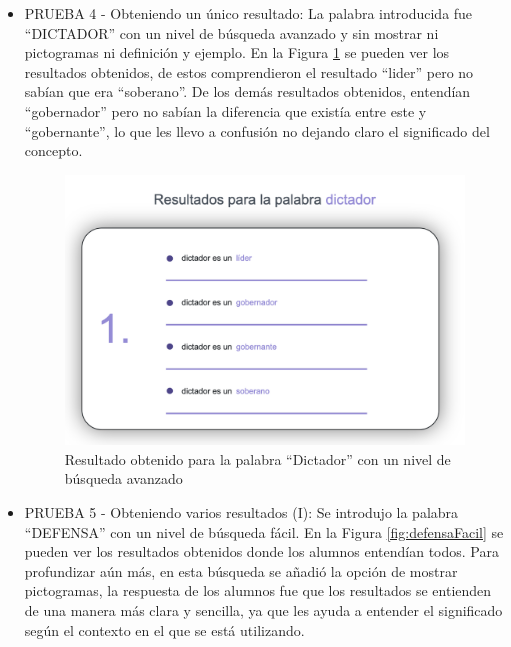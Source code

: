 \begin{itemize}
	\item PRUEBA 4 - Obteniendo un único resultado: La palabra introducida fue ``DICTADOR'' con un nivel de búsqueda avanzado y sin mostrar ni pictogramas ni definición y ejemplo. En la Figura \ref{fig:dictadorAvanzado} se pueden ver los resultados obtenidos, de estos comprendieron el resultado ``lider'' pero no sabían que era ``soberano''. De los demás resultados obtenidos, entendían ``gobernador'' pero no sabían la diferencia que existía entre este y ``gobernante'', lo que les llevo a confusión no dejando claro el significado del concepto.
	
		\begin{figure}[!h]
			\includegraphics[width=.7\textwidth]{Imagenes/Bitmap/Capitulo4/EvaluacionFinal/4dictadoravanzado.png}
			\centering
			\caption{Resultado obtenido para la palabra ``Dictador'' con un nivel de búsqueda avanzado}
			\label{fig:dictadorAvanzado}
		\end{figure}
	
	\item PRUEBA 5 - Obteniendo varios resultados (I):  Se introdujo la palabra ``DEFENSA'' con un nivel de búsqueda fácil. En la Figura \ref{fig:defensaFacil} se pueden ver los resultados obtenidos donde los alumnos entendían todos. Para profundizar aún más, en esta búsqueda se añadió la opción de mostrar pictogramas, la respuesta de los alumnos fue que los resultados se entienden de una manera más clara y sencilla, ya que les ayuda a entender el significado según el contexto en el que se está utilizando.
		

\end{itemize}
